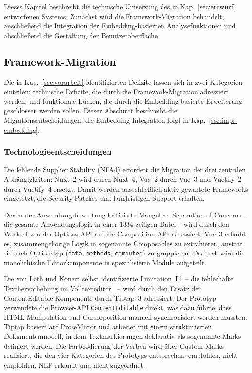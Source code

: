 
Dieses Kapitel beschreibt die technische Umsetzung des in Kap.~\ref{sec:entwurf} entworfenen Systems.
Zunächst wird die Framework-Migration behandelt, anschließend die Integration der Embedding-basierten Analysefunktionen und abschließend die Gestaltung der Benutzeroberfläche.

\subsection{Framework-Migration}\label{sec:migration}

Die in Kap.~\ref{sec:vorarbeit} identifizierten Defizite lassen sich in zwei Kategorien einteilen: technische Defizite, die durch die Framework-Migration adressiert werden, und funktionale Lücken, die durch die Embedding-basierte Erweiterung geschlossen werden sollen.
Dieser Abschnitt beschreibt die Migrationsentscheidungen; die Embedding-Integration folgt in Kap.~\ref{sec:impl-embedding}.

\subsubsection{Technologieentscheidungen}\label{sec:tech-entscheidungen}

Die fehlende Supplier Stability (NFA4) erfordert die Migration der drei zentralen Abhängigkeiten: Nuxt~2 wird durch Nuxt~4, Vue~2 durch Vue~3 und Vuetify~2 durch Vuetify~4 ersetzt.
Damit werden ausschließlich aktiv gewartete Frameworks eingesetzt, die Security-Patches und langfristigen Support erhalten.

Der in der Anwendungsbewertung kritisierte Mangel an Separation of Concerns -- die gesamte Anwendungslogik in einer 1334-zeiligen Datei -- wird durch den Wechsel von der Options API auf die Composition API adressiert.
Vue~3 erlaubt es, zusammengehörige Logik in sogenannte Composables zu extrahieren, anstatt sie nach Optionstyp (\texttt{data}, \texttt{methods}, \texttt{computed}) zu gruppieren.
Dadurch wird die monolithische Editorkomponente in spezialisierte Module aufgeteilt.

Die von Loth und Konert selbst identifizierte Limitation~L1 -- die fehlerhafte Texthervorhebung im Volltexteditor~\cite{loth2022kompetenzeditor} -- wird durch den Ersatz der ContentEditable-Komponente durch Tiptap~3 adressiert.
Der Prototyp verwendete die Browser-API \texttt{ContentEditable} direkt, was dazu führte, dass HTML-Manipulation und Cursorposition manuell synchronisiert werden mussten.
Tiptap basiert auf ProseMirror und arbeitet mit einem strukturierten Dokumentenmodell, in dem Textmarkierungen deklarativ als sogenannte Marks definiert werden.
Die Farbcodierung der Verben wird über Custom Marks realisiert, die den vier Kategorien des Prototyps entsprechen: empfohlen, nicht empfohlen, NLP-erkannt und nicht zugeordnet.

